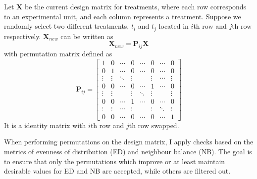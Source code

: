\documentclass[
  a4paper,
  oneside,
  openany,
  12pt,
  onecolumn]{book}
\theoremstyle{definition}
\theoremstyle{plain}
\theoremstyle{remark}
\begin{document}
Let \(\boldsymbol{X}\) be the current design matrix for treatments,
where each row corresponds to an experimental unit, and each column
represents a treatment. Suppose we randomly select two different
treatments, \(t_i\) and \(t_j\) located in \(i\)th row and \(j\)th row
respectively. \(\boldsymbol{X}_{new}\) can be written as \[
\boldsymbol{X}_{new} = \boldsymbol{P}_{ij}\boldsymbol{X}
\] with permutation matrix defined as \[
 \boldsymbol{P}_{i j}=\left[
 \begin{array}{cccccccc}
 1 & 0 & \cdots & 0 & \cdots & 0 & \cdots & 0 \\ 
 0 & 1 & \cdots & 0 & \cdots &0 & \cdots & 0 \\ 
 \vdots & \vdots & \ddots & \vdots & & \vdots & \cdots & \vdots \\ 
 0 & 0 & \cdots & 0 & \cdots & 1 & \cdots & 0 \\
 \vdots & \vdots & & \vdots & \ddots & \vdots & & \vdots\\
 0 & 0 & \cdots & 1 & \cdots & 0 & \cdots & 0 \\ 
 \vdots & \vdots & \cdots & \vdots & & \vdots & \ddots & \vdots \\ 
 0 & 0 & \cdots & 0 & \cdots & 0 & \cdots & 1
 \end{array}\right] 
\] It is a identity matrix with \(i\)th row and \(j\)th row swapped.

When performing permutations on the design matrix, I apply checks based
on the metrics of evenness of distribution (ED) and neighbour balance
(NB). The goal is to ensure that only the permutations which improve or
at least maintain desirable values for ED and NB are accepted, while
others are filtered out.
\end{document}
